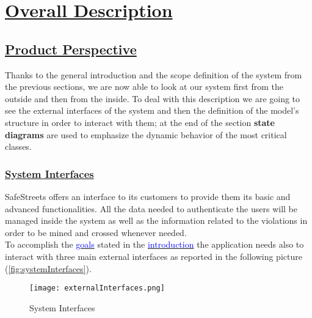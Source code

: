 \section[Overall Description]{\hyperlink{toc}{Overall Description}}

\subsection[Product Perspective]{\hyperlink{toc}{Product Perspective}}
	Thanks to the general introduction and the scope definition of the system from the previous sections, we are now able to look at our system first from the outside and then from the inside. To deal with this description we are going to see the external interfaces of the system and then the definition of the model's structure in order to interact with them; at the end of the section \textbf{state diagrams} are used to emphasize the dynamic behavior of the most critical classes.
	\subsubsection[System Interfaces]{\hyperlink{toc}{System Interfaces}}
		\label{sec:systemInterfaces}
		SafeStreets offers an interface to its customers to provide them its basic and advanced functionalities. All the data needed to authenticate the users will be managed inside the system as well as the information related to the violations in order to be mined and crossed whenever needed.\\
		
		To accomplish the \hyperref[sec:goals]{\textcolor{blue}{goals}} stated in the \hyperref[sec:introduction]{\textcolor{blue}{introduction}} the application needs also to interact with three main external interfaces as reported in the following picture (\autoref{fig:systemInterfaces}).  
		\vspace{0,3cm}
		
		\begin{figure}[h]
			\centering
			\texttt{[image: externalInterfaces.png]}
			\caption{\label{fig:systemInterfaces}System Interfaces}
		\end{figure}
		

